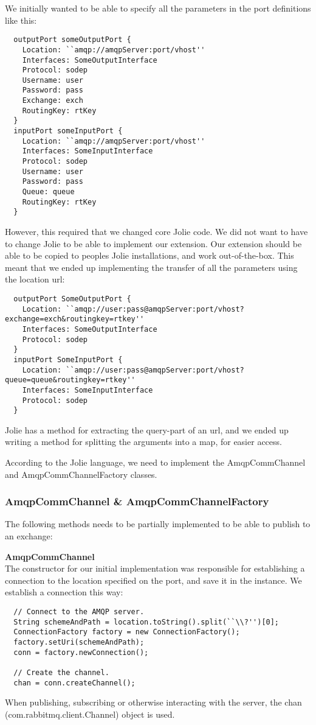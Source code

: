 We initially wanted to be able to specify all the parameters in the port definitions like this:

\begin{lstlisting}
  outputPort someOutputPort {
    Location: ``amqp://amqpServer:port/vhost''
    Interfaces: SomeOutputInterface
    Protocol: sodep
    Username: user
    Password: pass
    Exchange: exch
    RoutingKey: rtKey
  }
  inputPort someInputPort {
    Location: ``amqp://amqpServer:port/vhost''
    Interfaces: SomeInputInterface
    Protocol: sodep
    Username: user
    Password: pass
    Queue: queue
    RoutingKey: rtKey
  }
\end{lstlisting}
However, this required that we changed core Jolie code. We did not want to have to change Jolie to be able to implement our extension. Our extension should be able to be copied to peoples Jolie installations, and work out-of-the-box. This meant that we ended up implementing the transfer of all the parameters using the location url:

\begin{lstlisting}
  outputPort SomeOutputPort {
    Location: ``amqp://user:pass@amqpServer:port/vhost?exchange=exch&routingkey=rtkey''
    Interfaces: SomeOutputInterface
    Protocol: sodep
  }
  inputPort SomeInputPort {
    Location: ``amqp://user:pass@amqpServer:port/vhost?queue=queue&routingkey=rtkey''
    Interfaces: SomeInputInterface
    Protocol: sodep
  }
\end{lstlisting}
Jolie has a method for extracting the query-part of an url, and we ended up writing a method for splitting the arguments into a map, for easier access.

According to the Jolie language, we need to implement the AmqpCommChannel and AmqpCommChannelFactory classes.
\subsubsection{AmqpCommChannel \& AmqpCommChannelFactory}
The following methods needs to be partially implemented to be able to publish to an exchange:

\noindent\textbf{AmqpCommChannel}\\
The constructor for our initial implementation was responsible for establishing a connection to the location specified on the port, and save it in the instance. We establish a connection this way:
\begin{lstlisting}
  // Connect to the AMQP server.
  String schemeAndPath = location.toString().split(``\\?'')[0];
  ConnectionFactory factory = new ConnectionFactory();
  factory.setUri(schemeAndPath);
  conn = factory.newConnection();

  // Create the channel.
  chan = conn.createChannel();
\end{lstlisting}
When publishing, subscribing or otherwise interacting with the server, the chan (com.rabbitmq.client.Channel) object is used.

